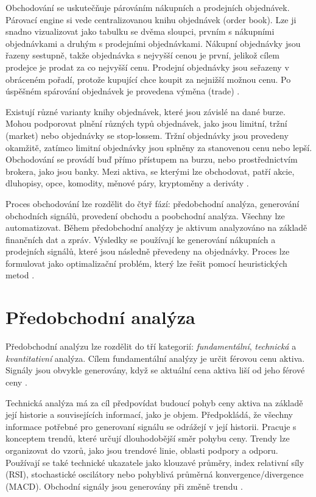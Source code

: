 Obchodování se uskutečňuje párováním nákupních a prodejních objednávek.
Párovací engine si vede centralizovanou knihu objednávek (order book).
Lze ji snadno vizualizovat jako tabulku se dvěma sloupci, prvním s nákupními objednávkami a druhým s prodejními objednávkami.
Nákupní objednávky jsou řazeny sestupně, takže objednávka s nejvyšší cenou je první, jelikož cílem prodejce je prodat za co nejvyšší cenu.
Prodejní objednávky jsou seřazeny v obráceném pořadí, protože kupující chce koupit za nejnižší možnou cenu.
Po úspěšném spárování objednávek je provedena výměna (trade) \cite{nuti}.

Existují různé varianty knihy objednávek, které jsou závislé na dané burze.
Mohou podporovat plnění různých typů objednávek, jako jsou limitní, tržní (market) nebo objednávky se stop-lossem.
Tržní objednávky jsou provedeny okamžitě, zatímco limitní objednávky jsou splněny za stanovenou cenu nebo lepší.
Obchodování se provádí buď přímo přístupem na burzu, nebo prostřednictvím brokera, jako jsou banky.
Mezi aktiva, se kterými lze obchodovat, patří akcie, dluhopisy, opce, komodity, měnové páry, kryptoměny a deriváty \cite{nuti}.

Proces obchodování lze rozdělit do čtyř fází: předobchodní analýza, generování obchodních signálů, provedení obchodu a poobchodní analýza.
Všechny lze automatizovat.
Během předobchodní analýzy je aktivum analyzováno na základě finančních dat a zpráv.
Výsledky se používají ke generování nákupních a prodejních signálů, které jsou následně převedeny na objednávky.
Proces lze formulovat jako optimalizační problém, který lze řešit pomocí heuristických metod \cite{nuti}.

\section{Předobchodní analýza}
Předobchodní analýzu lze rozdělit do tří kategorií: \textit{fundamentální}, \textit{technická} a \textit{kvantitativní} analýza.
Cílem fundamentální analýzy je určit férovou cenu aktiva.
Signály jsou obvykle generovány, když se aktuální cena aktiva liší od jeho férové ceny \cite{nuti}.

Technická analýza má za cíl předpovídat budoucí pohyb ceny aktiva na základě její historie a souvisejících informací, jako je objem.
Předpokládá, že všechny informace potřebné pro generovaní signálu se odrážejí v její historii.
Pracuje s konceptem trendů, které určují dlouhodobější směr pohybu ceny.
Trendy lze organizovat do vzorů, jako jsou trendové linie, oblasti podpory a odporu.
Používají se také technické ukazatele jako klouzavé průměry, index relativní síly (RSI), stochastické oscilátory nebo pohyblivá průměrná konvergence/divergence (MACD).
Obchodní signály jsou generovány při změně trendu \cite{nuti}.

